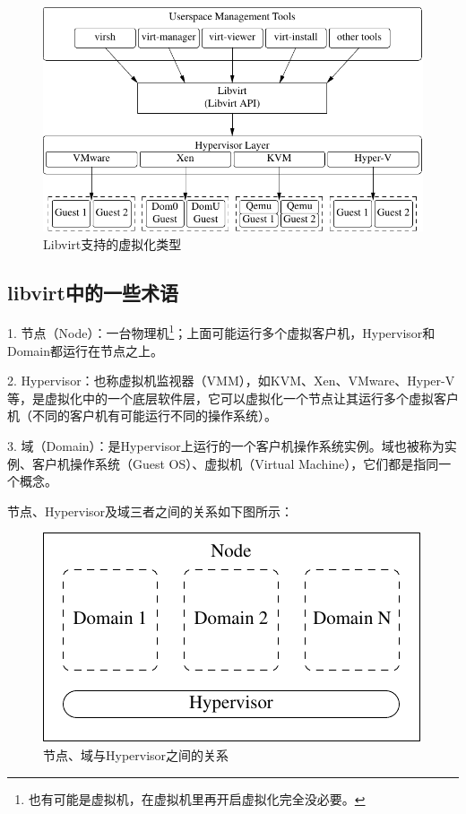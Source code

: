 \begin{figure}[ht]
  \centering
  \includegraphics{graph/libvirt_support.pdf}
  \caption{\label{fig:libvirtSupport} Libvirt支持的虚拟化类型}
\end{figure}

\subsection{libvirt中的一些术语}
\label{sec:libvirtTerm}
1. 节点（Node）：一台物理机\footnote{也有可能是虚拟机，在虚拟机里再开启虚拟化完全没必要。}；上面可能运行多个虚拟客户机，Hypervisor和Domain都运行在节点之上。

2. Hypervisor：也称虚拟机监视器（VMM），如KVM、Xen、VMware、Hyper-V等，是虚拟化中的一个底层软件层，它可以虚拟化一个节点让其运行多个虚拟客户机（不同的客户机有可能运行不同的操作系统）。

3. 域（Domain）：是Hypervisor上运行的一个客户机操作系统实例。域也被称为实例、客户机操作系统（Guest OS）、虚拟机（Virtual Machine），它们都是指同一个概念。

节点、Hypervisor及域三者之间的关系如下图所示：

\begin{figure}[htbp]
  \centering
  \includegraphics{graph/libvirt_node_hypervisor_domain.pdf}
  \caption{\label{fig:libvirtNodeHyperDomain} 节点、域与Hypervisor之间的关系}
\end{figure}

